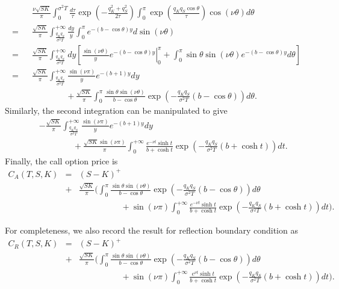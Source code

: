 \documentclass[12pt]{article}
\begin{document}
  \begin{eqnarray}
    && \frac{\nu\sqrt{SK}}{\pi}\int_0^{\sigma^2 T}\frac{d\tau}{\tau}\exp\left(-\frac{q_K^2+q_S^2}{2\tau}\right)
       \int_0^{\pi}\exp\left(\frac{q_Kq_S\cos\theta}{\tau}\right)\cos(\nu\theta)d\theta\nonumber\\
    = && \frac{\sqrt{SK}}{\pi}\int_{\frac{q_Kq_S}{\sigma^2 T}}^{+\infty}\frac{dy}{y}
       \int_0^{\pi}e^{-(b-\cos\theta)y}d\sin(\nu\theta)\nonumber\\
    = && \frac{\sqrt{SK}}{\pi}\int_{\frac{q_Kq_S}{\sigma^2 T}}^{+\infty}dy
         \left[\left.\frac{\sin(\nu\theta)}{y}e^{-(b-\cos\theta)y}\right|_0^{\pi}
              +\int_0^{\pi}\sin\theta\sin(\nu\theta)e^{-(b-\cos\theta)y}d\theta\right]\nonumber\\
    = && \frac{\sqrt{SK}}{\pi}\int_{\frac{q_Kq_S}{\sigma^2 T}}^{+\infty}\frac{\sin(\nu\pi)}{y}e^{-(b+1)y}dy\nonumber\\
      && \quad\quad\quad\quad+ \frac{\sqrt{SK}}{\pi}\int_0^{\pi}\frac{\sin\theta\sin(\nu\theta)}{b-\cos\theta}
       \exp\left(-\frac{q_Kq_S}{\sigma^2T}\left(b-\cos\theta\right)\right)d\theta.
  \end{eqnarray}
  Similarly, the second integration can be manipulated to give
  \begin{eqnarray}
    && -\frac{\sqrt{SK}}{\pi}\int_{\frac{q_Kq_S}{\sigma^2 T}}^{+\infty}\frac{\sin(\nu\pi)}{y}e^{-(b+1)y}dy\nonumber\\
      && \quad\quad\quad\quad+ \frac{\sqrt{SK}\sin(\nu\pi)}{\pi}\int_0^{+\infty}\frac{e^{-\nu t}\sinh t}{b+\cosh t}
       \exp\left(-\frac{q_Kq_S}{\sigma^2T}\left(b+\cosh t\right)\right)dt.
  \end{eqnarray}
  Finally, the call option price is
  \begin{eqnarray}
    C_A(T,S,K) &=& (S-K)^+ \nonumber\\
             &+&\frac{\sqrt{SK}}{\pi}\Bigg(\int_0^{\pi}\frac{\sin\theta\sin(\nu\theta)}{b-\cos\theta}
                        \exp\left(-\frac{q_Kq_S}{\sigma^2T}\left(b-\cos\theta\right)\right)d\theta\nonumber\\
             &&\quad\quad\quad\quad\quad + \sin(\nu\pi)\int_0^{+\infty}\frac{e^{-\nu t}\sinh t}{b+\cosh t}
       \exp\left(-\frac{q_Kq_S}{\sigma^2T}\left(b+\cosh t\right)\right)dt\Bigg).
  \end{eqnarray}

  For completeness, we also record the result for reflection boundary condition as
  \begin{eqnarray}
    C_R(T,S,K) &=& (S-K)^+ \nonumber\\
             &+&\frac{\sqrt{SK}}{\pi}\Bigg(\int_0^{\pi}\frac{\sin\theta\sin(\nu\theta)}{b-\cos\theta}
                        \exp\left(-\frac{q_Kq_S}{\sigma^2T}\left(b-\cos\theta\right)\right)d\theta\nonumber\\
             &&\quad\quad\quad\quad\quad + \sin(\nu\pi)\int_0^{+\infty}\frac{e^{\nu t}\sinh t}{b+\cosh t}
       \exp\left(-\frac{q_Kq_S}{\sigma^2T}\left(b+\cosh t\right)\right)dt\Bigg).
  \end{eqnarray}
\end{document}
